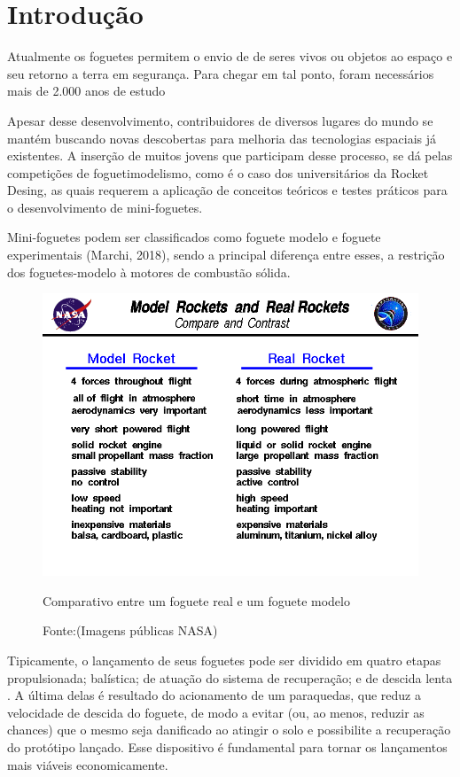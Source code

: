 \documentclass[a4paper, 12pt]{article}[abntex2]
\begin{document}
{        \section{Introdução}
            Atualmente os foguetes permitem o envio de de seres vivos ou objetos ao espaço e seu retorno a terra em segurança. Para chegar em tal ponto, foram necessários mais de 2.000 anos de estudo \cite{Shearer08}\par Apesar desse desenvolvimento, contribuidores de diversos lugares do mundo se mantém buscando novas descobertas para melhoria das tecnologias espaciais já existentes. A inserção de muitos jovens que participam desse processo, se dá pelas competições de foguetimodelismo, como é o caso dos universitários da Rocket Desing, as quais requerem a aplicação de conceitos teóricos e testes práticos para o desenvolvimento de mini-foguetes.\par Mini-foguetes podem ser classificados como foguete modelo e foguete experimentais (Marchi, 2018), sendo a principal diferença entre esses, a restrição dos foguetes-modelo à motores de combustão sólida.
            \\
            \begin{figure}[h!]
                \centering
                \includegraphics[width = 0.5\linewidth]{figuras/rktcompare.png}
                \caption{Comparativo entre um foguete real e um foguete modelo}
                \caption*{Fonte:(Imagens públicas NASA)}
                \label{fig: model rocket x real rocket}
            \end{figure}
            \par
            Tipicamente, o lançamento de seus foguetes pode ser dividido em quatro etapas propulsionada; balística; de atuação do sistema de recuperação; e de descida lenta \cite{cristello17}. A última delas é resultado do acionamento de um paraquedas, que reduz a velocidade de descida do foguete, de modo a evitar (ou, ao menos, reduzir as chances) que o mesmo seja danificado ao atingir o solo e possibilite a recuperação do protótipo lançado. Esse dispositivo é fundamental para tornar os lançamentos mais viáveis economicamente.
}
\end{document}
